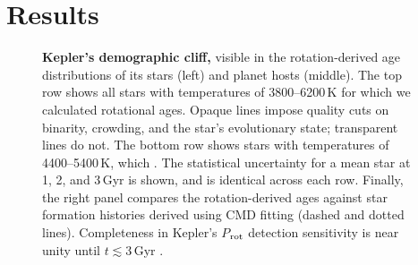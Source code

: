 \documentclass[11pt,twocolumn,tighten,linenumbers,trackchanges]{aastex63}
\begin{document}
\section{Results}
\label{sec:results}

\begin{figure}[!t]
  \begin{center}
    \leavevmode

	\vspace{-0.35cm}
  \end{center}
  \vspace{-0.6cm}
  \caption{{\bf Kepler's demographic cliff,} visible in the
  rotation-derived age distributions of its stars (left) and planet
  hosts (middle).  The top row shows all stars with temperatures of
  3800--6200\,K for which we calculated rotational ages.  Opaque lines
  impose quality cuts on binarity, crowding, and the star's
  evolutionary state; transparent lines do not.  The bottom row shows
  stars with temperatures of 4400--5400\,K, which .  The statistical uncertainty for a
  mean star at 1, 2, and 3\,Gyr is shown, and is identical across each
  row.  Finally, the right panel compares the rotation-derived ages
  against star formation histories derived using CMD fitting (dashed
  and dotted lines).  Completeness in Kepler's $P$$_{\rm rot}$
  detection sensitivity is near unity until $t$$\lesssim$3\,Gyr
  \citep{2022ApJ...937...94M}.
  \label{fig:hist_tgyro}
  }
\end{figure}
\end{document}
